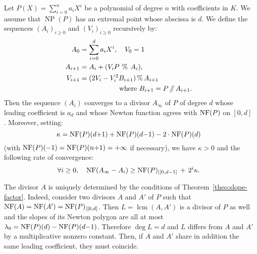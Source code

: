 \documentclass{sig-alternate-05-2015}
\DeclareMathOperator{\NP}{NP}
\DeclareMathOperator{\lcm}{lcm}
\newcommand{\NF}{\text{\rm NF}}
\renewcommand{\mod}{\,\%\,}
\renewcommand{\div}{\,/\hspace{-0.3em}/\,}
\begin{document}
\begin{theo} \label{theo:slope-factor}
Let $P(X) = \sum_{i=0}^n a_i X^i$ be a polynomial of degree $n$ with
coefficients in $K$. We assume that $\NP(P)$ has an extremal point 
whose abscissa is $d$.
We define the sequences $(A_i)_{i \geq 0}$ and $(V_i)_{i \geq 0}$
recursively by:
\begin{align*}
A_0 & = \sum_{i=0}^d a_i X^i, \quad V_{0} = 1 \medskip \\
A_{i+1} &= A_i + (V_i P \:\mod\: A_i), \smallskip \\
V_{i+1} &= (2 V_i -V_i^2 B_{i+1} ) \mod A_{i+1} \\
& \hspace{2cm}\text{where } B_{i+1} = P \div A_{i+1}.
\end{align*}
Then the sequence $(A_i)$ converges to a divisor $A_\infty$ of $P$ 
of degree $d$ whose leading coefficient is $a_d$ and whose Newton 
function agrees with $\NF(P)$ on $[0,d]$.
Moreover, setting:
$$\kappa = \NF(P)(d{+}1) + \NF(P)(d{-}1) - 2 \cdot \NF(P)(d)$$
(with $\NF(P)(-1) = \NF(P)(n{+}1) = +\infty$ if necessary),
we have $\kappa > 0$ and the following rate of convergence:
\begin{equation}
\label{eq:rateconv}
\forall i \geq 0, \quad
\NF(A_\infty - A_i) \geq \NF(P)_{|[0,d{-}1]} \,+\, 2^i \kappa.
\end{equation}
\end{theo}


%

\begin{rem}
\label{rem:unicity}
The divisor $A$ is uniquely determined by the conditions of 
Theorem~\ref{theo:slope-factor}. Indeed, consider two divisors
$A$ and $A'$ of $P$ such that $\NF(A) = \NF(A') = \NF(P)_{|[0,d]}$.
Then $L = \lcm(A,A')$ is a divisor of $P$ as well and the 
slopes of its Newton polygon are all at most $\lambda_0 = \NF(P)(d) - 
\NF(P)(d{-}1)$. Therefore $\deg L = d$ and $L$ differs from $A$ and
$A'$ by a multiplicative nonzero constant. Then, if $A$ and $A'$ 
share in addition the same leading coefficient, they must coincide.
\end{rem}
\end{document}
